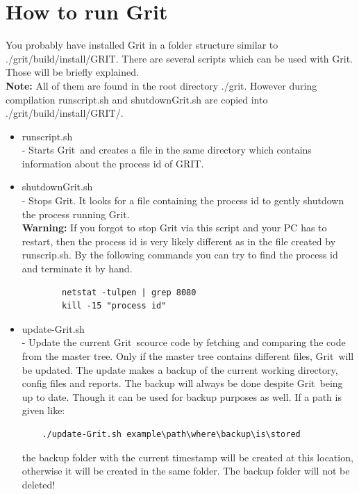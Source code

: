 \documentclass[10pt,a4paper, titlepage, toc=idx]{scrreprt}
\theoremstyle{definition}
\theoremstyle{plain}
\newcommand*{\product}{Grit}
\begin{document}
	\section{How to run \product{}}
	You probably have installed \product{} in a folder structure similar to 
	./grit/build/install/GRIT. There are several scripts which can be used with \product.
	Those will be briefly explained.\\
	
	\noindent \textbf{Note:} All of them are found in the root directory ./grit. However 
	during compilation runscript.sh and shutdownGrit.sh are copied into ./grit/build/install/GRIT/.
	
\begin{itemize}

\item runscript.sh\\
		- Starts \product\ and creates a file in the same directory which contains information about the process id of GRIT.
\item shutdownGrit.sh\\
		- Stops \product. It looks for a file containing the process id to gently shutdown the process running
		\product.\\
		
		\noindent \textbf{Warning: } If you forgot to stop Grit via this script and your PC has to restart, then
		the process id is very likely different as in the file created by runscrip.sh. By the following commands 	you can try to find the process id and terminate it by hand.
\begin{lstlisting}
		netstat -tulpen | grep 8080
		kill -15 "process id"
\end{lstlisting}
		\item update-Grit.sh\\
		- Update the current \product\ scource code by fetching and comparing the code from the master tree. Only if the master tree contains different files, \product\ will be updated. The update makes a backup of       		the current working directory, config files and reports. The backup will always be done despite \product\ being up to date. Though it can be used for backup purposes as well. If a path is given like: 
\begin{lstlisting}
	./update-Grit.sh example\path\where\backup\is\stored
\end{lstlisting}
		the backup folder with the current timestamp will be created at this location, otherwise it will be created in the same folder. The backup folder will not be deleted!\\


\end{itemize}
\end{document}

